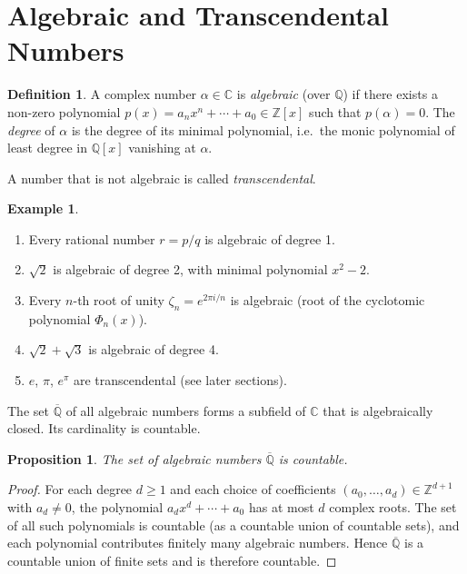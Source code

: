 \documentclass[12pt,a4paper]{amsart}
\newtheorem{proposition}[theorem]{Proposition}
\theoremstyle{definition}
\newtheorem{definition}[theorem]{Definition}
\newtheorem{example}[theorem]{Example}
\begin{document}
\section{Algebraic and Transcendental Numbers}
\label{sec:algebraic-transcendental}

\begin{definition}
A complex number $\alpha \in \mathbb{C}$ is \emph{algebraic} (over $\mathbb{Q}$)
if there exists a non-zero polynomial $p(x) = a_n x^n + \cdots + a_0 \in
\mathbb{Z}[x]$ such that $p(\alpha) = 0$. The \emph{degree} of $\alpha$ is the
degree of its minimal polynomial, i.e.\ the monic polynomial of least degree
in $\mathbb{Q}[x]$ vanishing at $\alpha$.

A number that is not algebraic is called \emph{transcendental}.
\end{definition}

\begin{example}
\begin{enumerate}[label=(\roman*)]
  \item Every rational number $r = p/q$ is algebraic of degree 1.
  \item $\sqrt{2}$ is algebraic of degree 2, with minimal polynomial $x^2 - 2$.
  \item Every $n$-th root of unity $\zeta_n = e^{2\pi i/n}$ is algebraic
        (root of the cyclotomic polynomial $\Phi_n(x)$).
  \item $\sqrt{2} + \sqrt{3}$ is algebraic of degree 4.
  \item $e$, $\pi$, $e^\pi$ are transcendental (see later sections).
\end{enumerate}
\end{example}

The set $\overline{\mathbb{Q}}$ of all algebraic numbers forms a subfield of
$\mathbb{C}$ that is algebraically closed. Its cardinality is countable.

\begin{proposition}
The set of algebraic numbers $\overline{\mathbb{Q}}$ is countable.
\end{proposition}
\begin{proof}
For each degree $d \geq 1$ and each choice of coefficients $(a_0, \ldots, a_d)
\in \mathbb{Z}^{d+1}$ with $a_d \neq 0$, the polynomial $a_d x^d + \cdots +
a_0$ has at most $d$ complex roots. The set of all such polynomials is
countable (as a countable union of countable sets), and each polynomial
contributes finitely many algebraic numbers. Hence $\overline{\mathbb{Q}}$ is
a countable union of finite sets and is therefore countable.
\end{proof}
\end{document}

